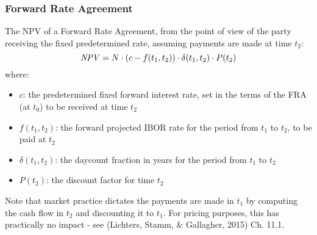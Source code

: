 \subsubsection{Forward Rate Agreement}
\label{pricing:ir_fra}

The NPV of a Forward Rate Agreement, from the point of view of the party 
receiving the fixed predetermined rate, assuming payments are made at time $t_2$:
$$
\mathit{NPV}= N\cdot (c - f(t_1,t_2))\cdot \delta (t_1, t_2) \cdot P(t_2)         
$$
where:
\begin{itemize}
\item $c$: the predetermined fixed forward interest rate, set in the terms 
of the FRA (at $t_0$) to be received at time $t_2$
\item $f(t_1,t_2)$: the forward projected IBOR rate for the period from $t_1$ 
to $t_2$, to be paid at $t_2$
\item $\delta(t_1, t_2)$: the daycount fraction in years for the period from $t_1$ 
to $t_2$
\item $P(t_2)$: the discount factor for time $t_2$
\end{itemize}

Note that market practice dictates the payments are made in $t_1$ by 
computing the cash flow in $t_2$ and discounting it to $t_1$. For pricing 
purposes, this has practically no impact - see 
(Lichters, Stamm, \& Gallagher, 2015) Ch. 11.1.
